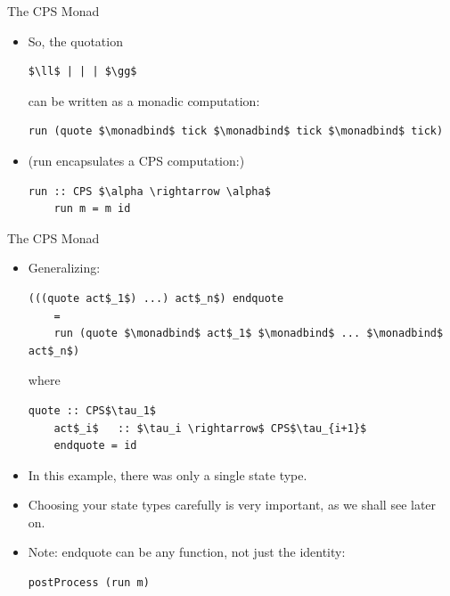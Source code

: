 \documentclass[10pt]{beamer}
\newcommand\monadbind{\gg\!\!=}
\begin{document}
\begin{frame}[fragile]{The CPS Monad}

\begin{itemize}

\item So, the quotation \begin{lstlisting}[mathescape=true]
	$\ll$ | | | $\gg$
\end{lstlisting}
can be written as a monadic computation:
\begin{lstlisting}[mathescape=true, escapechar=!]
	run (quote $\monadbind$ tick $\monadbind$ tick $\monadbind$ tick)
\end{lstlisting}

\item (run encapsulates a CPS computation:)
\begin{lstlisting}[mathescape=true, escapechar=!]
	run :: CPS $\alpha \rightarrow \alpha$
	run m = m id
\end{lstlisting}

\end{itemize}

\end{frame}

\begin{frame}[fragile]{The CPS Monad}

\begin{itemize}

\item Generalizing:
\begin{lstlisting}[mathescape=true]
	(((quote act$_1$) ...) act$_n$) endquote
	=
	run (quote $\monadbind$ act$_1$ $\monadbind$ ... $\monadbind$ act$_n$) 
\end{lstlisting}
where
\begin{lstlisting}[mathescape=true]
	quote :: CPS$\tau_1$
	act$_i$   :: $\tau_i \rightarrow$ CPS$\tau_{i+1}$
	endquote = id
\end{lstlisting}

\item In this example, there was only a single state type.
\item Choosing your state types carefully is very important, as we shall see later on.

\item Note: endquote can be any function, not just the identity:
\begin{lstlisting}[mathescape=true]
	postProcess (run m)
\end{lstlisting}

\end{itemize}

\end{frame}
\end{document}
